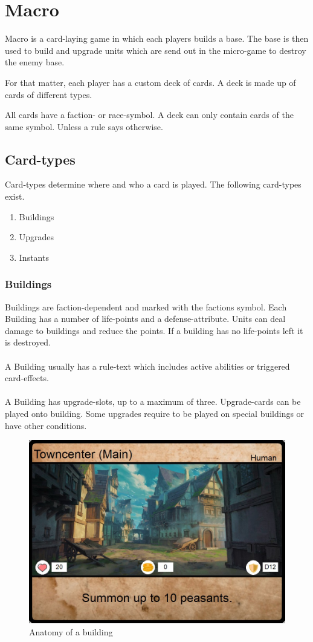 \documentclass[a5paper,pagesize,10pt,bibtotoc,pointlessnumbers,
normalheadings,DIV=9,twoside=false]{scrbook}
\begin{document}
\chapter{Macro}
Macro is a card-laying game in which each players builds a base. The base is then used to build and upgrade units which are send out in the micro-game to destroy the enemy base.

For that matter, each player has a custom deck of cards. A deck is made up of cards of different types.

All cards have a faction- or race-symbol. A deck can only contain cards of the same symbol. Unless a rule says otherwise.

\section{Card-types}
Card-types determine where and who a card is played. The following card-types exist.

\begin{enumerate}
\item Buildings
\item Upgrades
\item Instants
\end{enumerate}

\subsection{Buildings}
Buildings are faction-dependent and marked with the factions symbol. Each Building has a number of life-points and a defense-attribute.
Units can deal damage to buildings and reduce the points. If a building has no life-points left it is destroyed.\\
\\
A Building usually has a rule-text which includes active abilities or triggered card-effects.\\
\\
A Building has upgrade-slots, up to a maximum of three.
Upgrade-cards can be played onto building. Some upgrades require to be played on special buildings or have other conditions.

\begin{figure}[t]
\includegraphics[scale=1.0]{examplebuilding}
\centering
\caption{Anatomy of a building}
\end{figure}
\end{document}
